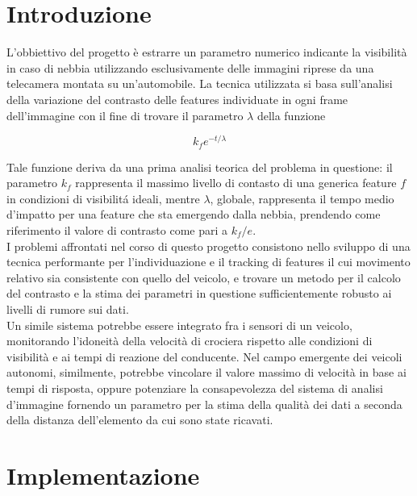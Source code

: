 \documentclass[12pt]{report}
\begin{document}

\tableofcontents

\chapter{Introduzione}

L'obbiettivo del progetto \`e estrarre un parametro numerico indicante la visibilit\`a in caso di nebbia utilizzando esclusivamente delle immagini riprese da una telecamera montata su un'automobile. La tecnica utilizzata si basa sull'analisi della variazione del contrasto delle features individuate in ogni frame dell'immagine con il fine di trovare il parametro $\lambda$ della funzione

$$k_fe^{-t/\lambda}$$

\noindent Tale funzione deriva da una prima analisi teorica del problema in questione: il parametro $k_f$ rappresenta il massimo livello di contasto di una generica feature $f$ in condizioni di visibilit\'a ideali, mentre $\lambda$, globale, rappresenta il tempo medio d'impatto per una feature che sta emergendo dalla nebbia, prendendo come riferimento il valore di contrasto come pari a $k_f/e$.\\

\noindent I problemi affrontati nel corso di questo progetto consistono nello sviluppo di una tecnica performante per l'individuazione e il tracking di features il cui movimento relativo sia consistente con quello del veicolo, e trovare un metodo per il calcolo del contrasto e la stima dei parametri in questione sufficientemente robusto ai livelli di rumore sui dati.\\
	 	
\noindent Un simile sistema potrebbe essere integrato fra i sensori di un veicolo, monitorando l'idoneit\`a della velocit\`a di crociera rispetto alle condizioni di visibilit\`a e ai tempi di reazione del conducente. Nel campo emergente dei veicoli autonomi, similmente, potrebbe vincolare il valore massimo di velocit\`a in base ai tempi di risposta, oppure potenziare la consapevolezza del sistema di analisi d'immagine fornendo un parametro per la stima della qualit\`a dei dati a seconda della distanza dell'elemento da cui sono state ricavati.



\chapter{Implementazione}
\end{document}
